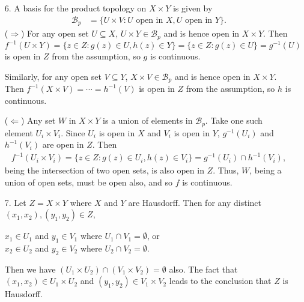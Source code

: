 \documentclass[a4paper,12pt]{article}
\begin{document}
\begin{enumerate}
    \item[6.]
        A basis for the product topology on $X \times Y$ is given by
        \begin{align*}
            \mathcal{B}_p &= \{ U \times V : U \text{ open in } X, U \text{ open in } Y \}.
        \end{align*}
        ($\Rightarrow$) For any open set $U \subseteq X$, $U \times Y \in \mathcal{B}_p$ and is hence open in $X \times Y$. Then $f^{-1}(U \times Y) = \{ z \in Z : g(z) \in U, h(z) \in Y \} = \{ z \in Z : g(z) \in U \} = g^{-1}(U)$ is open in $Z$ from the assumption, so $g$ is continuous. \par
        Similarly, for any open set $V \subseteq Y$, $X \times V \in \mathcal{B}_p$ and is hence open in $X \times Y$. Then $f^{-1}(X \times V) = \cdots = h^{-1}(V)$ is open in $Z$ from the assumption, so $h$ is continuous. \par
        ($\Leftarrow$) Any set $W$ in $X \times Y$ is a union of elements in $\mathcal{B}_p$. Take one such element $U_i \times V_i$. Since $U_i$ is open in $X$ and $V_i$ is open in $Y$, $g^{-1}(U_i)$ and $h^{-1}(V_i)$ are open in $Z$. Then
        \begin{align*}
            f^{-1}(U_i \times V_i) = \{ z \in Z: g(z) \in U_i, h(z) \in V_i \} = g^{-1}(U_i) \cap h^{-1}(V_i),
        \end{align*}
        being the intersection of two open sets, is also open in $Z$. Thus, $W$, being a union of open sets, must be open also, and so $f$ is continuous.
        \iffalse
            Since $f$ is continuous, for any open set $W$ in the product topology on $X \times Y$, $f^{-1}(W)$ is open. \par
            If $W \in \mathcal{B}_p$, then $W = U \times V$ for some $U$ open in $X$, $V$ open in $Y$, and
            \begin{align*}
                f^{-1}(W) &= \{ z \in Z : f(z) \in W \} = \{ z \in Z : g(z) \in U, h(z) \in V \} \\
                &= g^{-1}(U) \cap h^{-1}(V),
            \end{align*}
            so $g^{-1}(U)$ and $h^{-1}(V)$ are open. \par
            If $W \notin \mathcal{B}_p$, then it is the union
        \fi

    \item[7.]
        Let $Z = X \times Y$ where $X$ and $Y$ are Hausdorff. Then for any distinct $(x_1, x_2), (y_1, y_2) \in Z$,
        \begin{center}
            $x_1 \in U_1$ and $y_1 \in V_1$ where $U_1 \cap V_1 = \emptyset$, or \\
            $x_2 \in U_2$ and $y_2 \in V_2$ where $U_2 \cap V_2 = \emptyset$.
        \end{center}
        Then we have $(U_1 \times U_2) \cap (V_1 \times V_2) = \emptyset$ also. The fact that $(x_1, x_2) \in U_1 \times U_2$ and $(y_1, y_2) \in V_1 \times V_2$ leads to the conclusion that $Z$ is Hausdorff.


\end{enumerate}
\end{document}
